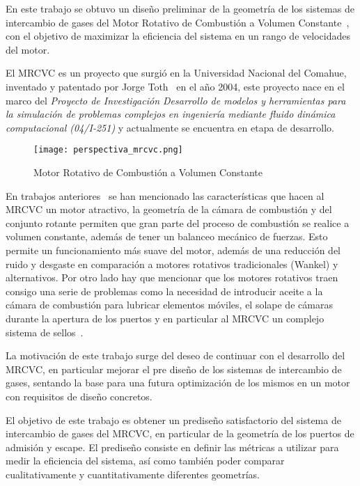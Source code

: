 En este trabajo se obtuvo un diseño preliminar de la geometría de los  sistemas
de intercambio de gases del Motor Rotativo de Combustión a Volumen
Constante~\parencite{toth}, con el objetivo de maximizar la eficiencia del
sistema en un rango de velocidades del motor.
%

El MRCVC es un proyecto que surgió en la Universidad Nacional del Comahue,
inventado y patentado por Jorge Toth~\parencite{toth} en el año 2004, este
proyecto nace en el marco del \emph{Proyecto de Investigación Desarrollo de
modelos y herramientas para la simulación de problemas complejos en ingeniería
mediante fluido dinámica computacional (04/I-251)} y actualmente se encuentra
en etapa de desarrollo.

\begin{figure}
    \centering
    \texttt{[image: perspectiva\_mrcvc.png]}
    \caption{Motor Rotativo de Combustión a Volumen Constante}\label{fig:mrcvc}
\end{figure}

En trabajos anteriores~\parencite{lopez16}\parencite{lopez13}\parencite{roldan}
se han mencionado las características que hacen al MRCVC un motor atractivo, la
geometría de la cámara de combustión y del conjunto rotante permiten que gran
parte del proceso de combustión se realice a volumen constante, además de tener
un balanceo mecánico de fuerzas.
%
Esto permite un funcionamiento más suave del motor, además de una reducción del
ruido y desgaste en comparación a motores rotativos tradicionales (Wankel) y
alternativos.
%
Por otro lado hay que mencionar que los motores rotativos traen consigo una
serie de problemas como la necesidad de introducir aceite a la cámara de
combustión para lubricar elementos móviles, el solape de cámaras durante la
apertura de los puertos y en particular al MRCVC un complejo sistema de
sellos~\parencite{roldan}.


La motivación de este trabajo surge del deseo de continuar con el
desarrollo del MRCVC, en particular mejorar el pre diseño de los sistemas de
intercambio de gases, sentando la base para una futura optimización de los
mismos en un motor con requisitos de diseño concretos.

El objetivo de este trabajo es obtener un prediseño satisfactorio
del sistema de intercambio de gases del MRCVC, en particular de la geometría de
los puertos de admisión y escape.
%
El prediseño consiste en definir las métricas a utilizar para medir la
eficiencia del sistema, así como también poder comparar cualitativamente y
cuantitativamente diferentes geometrías.

